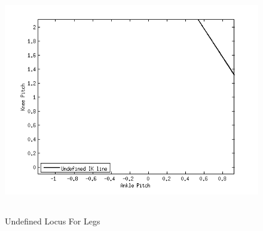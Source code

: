 \begin{figure}[!h]
	\begin{center}
		\includegraphics[height = 10cm]{Figures/locus.png}
 		\caption{Undefined Locus For Legs}
 		\label{fig:unlocus}
	\end{center}
\end{figure}

